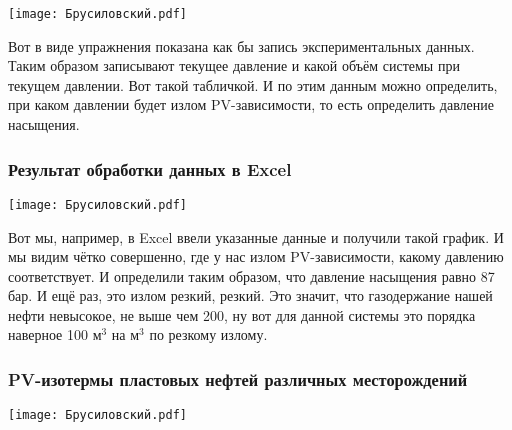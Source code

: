 \documentclass[main.tex]{subfiles}
\begin{document}
\begin{center}
\texttt{[image: Брусиловский.pdf]}
\end{center}

Вот в виде упражнения показана как бы запись экспериментальных данных.
Таким образом записывают текущее давление и какой объём системы при текущем давлении.
Вот такой табличкой.
И по этим данным можно определить, при каком давлении будет излом PV-зависимости, то есть определить давление насыщения.

\subsubsection{Результат обработки данных в Excel}

\begin{center}
\texttt{[image: Брусиловский.pdf]}
\end{center}

Вот мы, например, в Excel ввели указанные данные и получили такой график.
И мы видим чётко совершенно, где у нас излом PV-зависимости, какому давлению соответствует.
И определили таким образом, что давление насыщения равно 87 бар.
И ещё раз, это излом резкий, резкий.
Это значит, что газодержание нашей нефти невысокое, не выше чем 200, ну вот для данной системы это порядка наверное 100 м$^3$ на м$^3$ по резкому излому.

\subsubsection{PV-изотермы пластовых нефтей различных месторождений}

\begin{center}
\texttt{[image: Брусиловский.pdf]}
\end{center}
\end{document}
